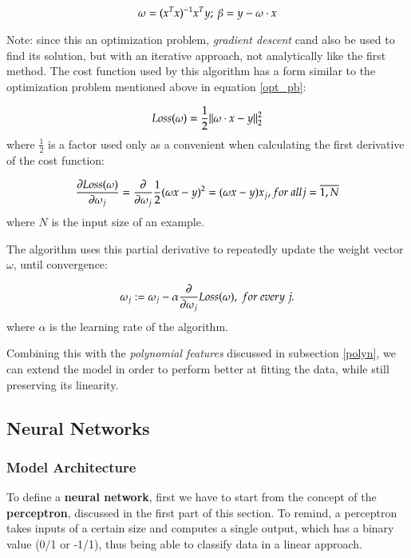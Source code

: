 \begin{equation}
\centering
\omega = (x^{T} x)^{-1} x^{T} y ;\ 
\beta = y - \omega \cdot x
\end{equation}

Note: since this an optimization problem, {\it gradient descent} cand also be 
used to find its solution, but with an iterative approach, not analytically like 
the first method. The cost function used by this algorithm has a form 
similar to the optimization problem mentioned above in equation \ref{opt_pb}: 

\begin{equation}
\centering
Loss(\omega) = \frac{1}{2}\| \omega \cdot x - y \|_{2}^{2}
\label{sq_loss}
\end{equation}
where $\frac{1}{2}$ is a factor used only as a convenient when calculating 
the first derivative of the cost function:

\begin{equation}
\centering
\frac{\partial Loss(\omega)}{\partial \omega_{j}} = \frac{\partial}{\partial \omega_{j}}\frac{1}{2}
(\omega x - y)^{2} = (\omega x - y) x_{j}, for\ all j = \overline{1, N}
\end{equation}
where $N$ is the input size of an example.

The algorithm uses this partial derivative to repeatedly update the weight vector 
$\omega$, until convergence:

\begin{equation}
\centering
\omega_{j} := \omega_{j} - \alpha \frac{\partial}{\partial \omega_{j}}Loss(\omega),
\ for\ every\ j.
\end{equation}
where $\alpha$ is the learning rate of the algorithm.

Combining this with the {\it polynomial features} discussed in subsection 
\ref{polyn}, we can extend the model in order to perform better at fitting the 
data, while still preserving its linearity.

\subsection{Neural Networks}
\label{nn_section}

\subsubsection{Model Architecture}

To define a {\bf neural network}, first we have to start from the concept of 
the {\bf perceptron}, discussed in the first part of this section. To remind, 
a perceptron takes inputs of a certain size and computes a single output, 
which has a binary value (0/1 or -1/1), thus being able to classify data 
in a linear approach. 

